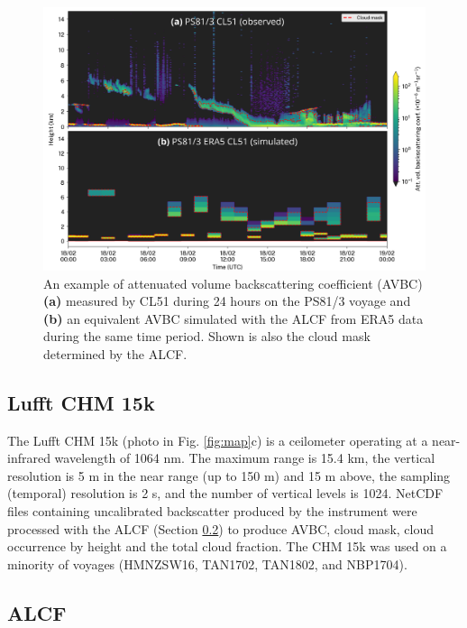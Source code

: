 \documentclass[12pt,a4paper]{article}
\begin{document}
\begin{figure}[b!]
\centering
\includegraphics[width=\textwidth]{img/example.png}
\caption{
An example of attenuated volume backscattering coefficient (AVBC) \textbf{(a)}
measured by CL51 during 24 hours on the PS81/3 voyage and \textbf{(b)} an
equivalent AVBC simulated with the ALCF from ERA5 data during the same time
period. Shown is also the cloud mask determined by the ALCF.
}
\label{fig:example}
\end{figure}

\subsection{Lufft CHM 15k}
\label{sec:chm15k}

The Lufft CHM 15k (photo in Fig. \ref{fig:map}c) is a ceilometer operating at a
near-infrared wavelength of 1064 nm. The maximum range is 15.4 km, the vertical
resolution is 5 m in the near range (up to 150 m) and 15 m above, the sampling
(temporal) resolution is 2 s, and the number of vertical levels is 1024.
NetCDF files containing uncalibrated backscatter produced by the instrument
were processed with the ALCF (Section \ref{sec:alcf}) to produce AVBC, cloud
mask, cloud occurrence by height and the total cloud fraction. The CHM 15k was
used on a minority of voyages (HMNZSW16, TAN1702, TAN1802, and NBP1704).

\subsection{ALCF}
\label{sec:alcf}
\end{document}
